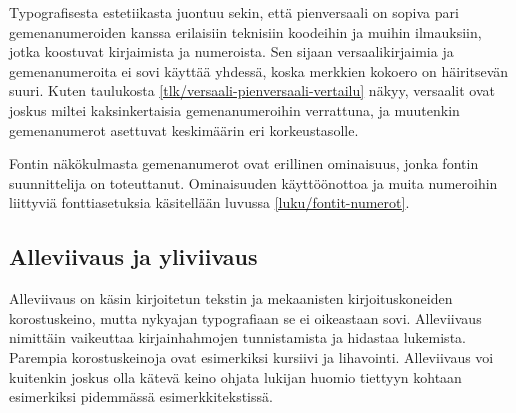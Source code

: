 Typografisesta estetiikasta juontuu sekin, että pienversaali on sopiva
pari gemenanumeroiden kanssa erilaisiin teknisiin koodeihin ja muihin
ilmauksiin, jotka koostuvat kirjaimista ja numeroista. Sen sijaan
versaalikirjaimia ja gemenanumeroita ei sovi käyttää yhdessä, koska
merkkien kokoero on häiritsevän suuri. Kuten taulukosta
\ref{tlk/versaali-pienversaali-vertailu} näkyy, versaalit ovat joskus
miltei kaksinkertaisia gemenanumeroihin verrattuna, ja muutenkin
gemenanumerot asettuvat keskimäärin eri korkeustasolle.


Fontin näkökulmasta gemenanumerot ovat erillinen ominaisuus, jonka
fontin suunnittelija on toteuttanut. Ominaisuuden käyttöönottoa ja muita
numeroihin liittyviä fonttiasetuksia käsitellään luvussa
\ref{luku/fontit-numerot}.

\subsection{Alleviivaus ja yliviivaus}

Alleviivaus on käsin kirjoitetun tekstin ja mekaanisten
kirjoituskoneiden korostuskeino, mutta nykyajan typografiaan se ei
oikeastaan sovi. Alleviivaus nimittäin vaikeuttaa kirjainhahmojen
tunnistamista ja hidastaa lukemista. Parempia korostuskeinoja ovat
esimerkiksi kursiivi ja lihavointi. Alleviivaus voi kuitenkin joskus
olla kätevä keino ohjata lukijan huomio tiettyyn kohtaan esimerkiksi
pidemmässä esimerkkitekstissä.

